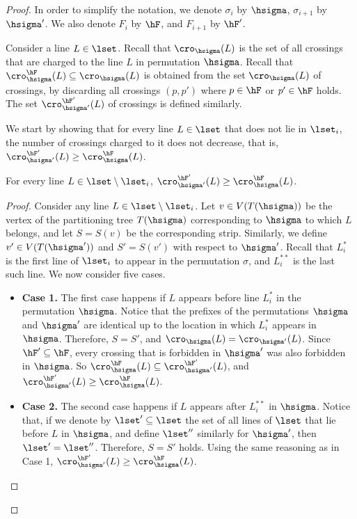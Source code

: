 \documentclass{toc}
\begin{document}
\begin{proof}
	In order to simplify the notation, we denote $\sigma_i$ by $\hsigma$, $\sigma_{i+1}$ by $\hsigma'$. We also denote $F_i$ by $\hF$, and $F_{i+1}$ by $\hF'$.
	
	
	Consider a line $L\in \lset$. Recall that $\cro_{\hsigma}(L)$ is the set of all crossings that are charged to the line $L$ in permutation $\hsigma$. Recall that $\cro^{\hF}_{\hsigma}(L)\subseteq \cro_{\hsigma}(L)$ is obtained from the set  $\cro_{\hsigma}(L)$ of crossings, by discarding all crossings $(p,p')$ where $p\in \hF$ or $p'\in \hF$ holds. The set $\cro^{\hF'}_{\hsigma'}(L)$ of crossings is defined similarly.
	
	We start by showing that for every line $L\in \lset$ that does not lie in $\lset_i$, the number of crossings charged to it does not decrease, that is, $\cro^{\hF'}_{\hsigma'}(L)\geq\cro^{\hF}_{\hsigma}(L)$.
	
	\begin{claim}\label{claim: lines outside of block do not change}
		For every line $L\in \lset\setminus \lset_i$, $\cro^{\hF'}_{\hsigma'}(L)\geq\cro^{\hF}_{\hsigma}(L)$.
	\end{claim}
	\begin{proof}
		Consider any line $L\in \lset\setminus \lset_i$. Let $v\in V(T({\hsigma}))$ be the vertex of the partitioning tree $T({\hsigma})$ corresponding to $\hsigma$ to which $L$ belongs, and let $S=S(v)$ be the corresponding strip. Similarly, we define $v'\in V(T({\hsigma'}))$ and $S'=S(v')$ with respect to $\hsigma'$.  
		Recall that $L^*_i$ is the first line of $\lset_i$ to appear in the permutation $\sigma$, and $L^{**}_i$ is the last such line. We now consider five cases.
		\begin{itemize}
		    \item 	{\bf Case 1.}	The first case happens if $L$ appears before line $L^*_i$ in the permutation $\hsigma$. Notice that the prefixes of the permutations $\hsigma$ and $\hsigma'$ are identical up to the location in which $L^*_i$ appears in $\hsigma$. Therefore, $S=S'$, and $\cro_{\hsigma}(L)=\cro_{\hsigma'}(L)$. Since $\hF'\subseteq \hF$, every crossing that is forbidden in $\hsigma'$ was also forbidden in $\hsigma$. So $\cro_{\hsigma}^{\hF}(L)\subseteq \cro_{\hsigma'}^{\hF'}(L)$, and $\cro^{\hF'}_{\hsigma'}(L)\geq\cro^{\hF}_{\hsigma}(L)$.
		    
		    \item 	{\bf Case 2.} The second case happens if $L$ appears after $L^{**}_i$ in $\hsigma$. Notice that, if we denote by $\lset'\subseteq \lset$ the set of all lines of $\lset$ that lie before $L$ in $\hsigma$, and define $\lset''$ similarly for $\hsigma'$, then $ \lset'=\lset''$. Therefore, $S=S'$ holds. Using the same reasoning as in Case 1,  $\cro^{\hF'}_{\hsigma'}(L)\geq\cro^{\hF}_{\hsigma}(L)$.
		    

\end{itemize}
\end{proof}
\end{proof}
\end{document}
